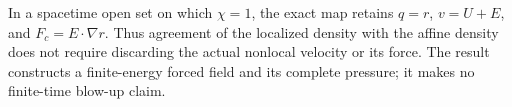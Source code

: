 In a spacetime open set on which $\chi=1$, the exact map retains
$q=r$, $v=U+E$, and $F_c=E\cdot\nabla r$. Thus agreement of the localized
density with the affine density does not require discarding the actual
nonlocal velocity or its force. The result constructs a finite-energy forced
field and its complete pressure; it makes no finite-time blow-up claim.


\endgroup
